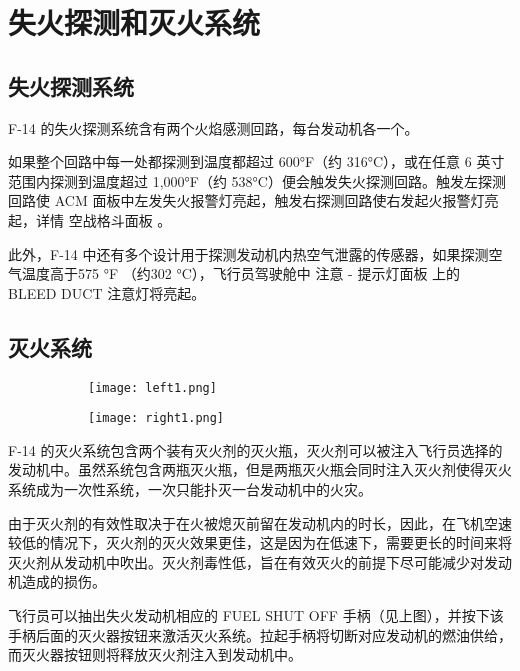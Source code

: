 
\section{失火探测和灭火系统}

\subsection{失火探测系统}
F-14 的失火探测系统含有两个火焰感测回路，每台发动机各一个。

如果整个回路中每一处都探测到温度都超过 600°F（约 316°C），或在任意 6 英寸范围内探测到温度超过 1,000°F（约 538°C）便会触发失火探测回路。触发左探测回路使 ACM 面板中左发失火报警灯亮起，触发右探测回路使右发起火报警灯亮起，详情 空战格斗面板 。

此外，F-14 中还有多个设计用于探测发动机内热空气泄露的传感器，如果探测空气温度高于575 °F （约302 °C），飞行员驾驶舱中 注意 - 提示灯面板 上的 BLEED DUCT 注意灯将亮起。

\subsection{灭火系统}

\begin{figure}[h]
	\centering
	\begin{subfigure}{0.45\textwidth}
		\centering
		\texttt{[image: left1.png]}
	\end{subfigure}
	\hspace{1em}
	\begin{subfigure}{0.45\textwidth}
		\centering
		\texttt{[image: right1.png]}
	\end{subfigure}
\end{figure}

F-14 的灭火系统包含两个装有灭火剂的灭火瓶，灭火剂可以被注入飞行员选择的发动机中。虽然系统包含两瓶灭火瓶，但是两瓶灭火瓶会同时注入灭火剂使得灭火系统成为一次性系统，一次只能扑灭一台发动机中的火灾。

由于灭火剂的有效性取决于在火被熄灭前留在发动机内的时长，因此，在飞机空速较低的情况下，灭火剂的灭火效果更佳，这是因为在低速下，需要更长的时间来将灭火剂从发动机中吹出。灭火剂毒性低，旨在有效灭火的前提下尽可能减少对发动机造成的损伤。

飞行员可以抽出失火发动机相应的 FUEL SHUT OFF 手柄（见上图），并按下该手柄后面的灭火器按钮来激活灭火系统。拉起手柄将切断对应发动机的燃油供给，而灭火器按钮则将释放灭火剂注入到发动机中。


